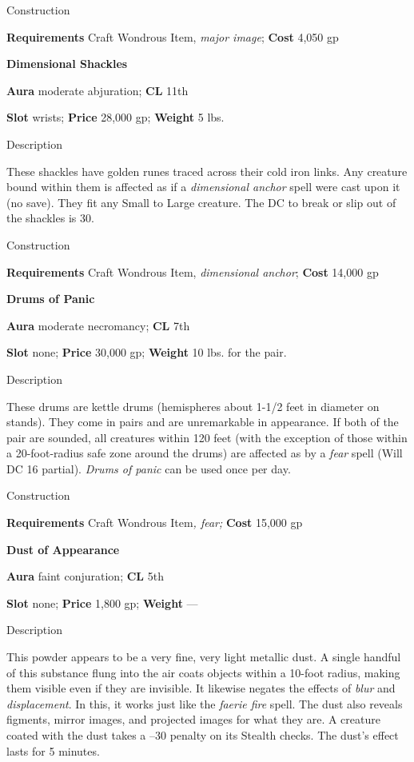 Construction
				
\textbf{Requirements} Craft Wondrous Item, \textit{major image}; \textbf{Cost }4,050 gp
				
\textbf{Dimensional Shackles}
				
\textbf{Aura} moderate abjuration;\textbf{ CL }11th
				
\textbf{Slot} wrists; \textbf{Price} 28,000 gp; \textbf{Weight} 5 lbs.
				
Description
				
These shackles have golden runes traced across their cold iron links. Any creature bound within them is affected as if a \textit{dimensional anchor }spell were cast upon it (no save). They fit any Small to Large creature. The DC to break or slip out of the shackles is 30. 
				
Construction
				
\textbf{Requirements} Craft Wondrous Item, \textit{dimensional anchor}; \textbf{Cost }14,000 gp
				
\textbf{Drums of Panic}
				
\textbf{Aura} moderate necromancy;\textbf{ CL }7th
				
\textbf{Slot} none; \textbf{Price} 30,000 gp; \textbf{Weight} 10 lbs. for the pair.
				
Description
				
These drums are kettle drums (hemispheres about 1-1/2 feet in diameter on stands). They come in pairs and are unremarkable in appearance. If both of the pair are sounded, all creatures within 120 feet (with the exception of those within a 20-foot-radius safe zone around the drums) are affected as by a \textit{fear} spell (Will DC 16 partial). \textit{Drums of panic} can be used once per day. 
				
Construction
				
\textbf{Requirements} Craft Wondrous Item\textit{, fear; }\textbf{Cost }15,000 gp
				
\textbf{Dust of Appearance}
				
\textbf{Aura} faint conjuration;\textbf{ CL }5th
				
\textbf{Slot} none; \textbf{Price} 1,800 gp; \textbf{Weight }---
				
Description
				
This powder appears to be a very fine, very light metallic dust. A single handful of this substance flung into the air coats objects within a 10-foot radius, making them visible even if they are invisible. It likewise negates the effects of \textit{blur} and \textit{displacement}. In this, it works just like the \textit{faerie fire} spell. The dust also reveals figments, mirror images, and projected images for what they are. A creature coated with the dust takes a --30 penalty on its Stealth checks. The dust's effect lasts for 5 minutes.
				
